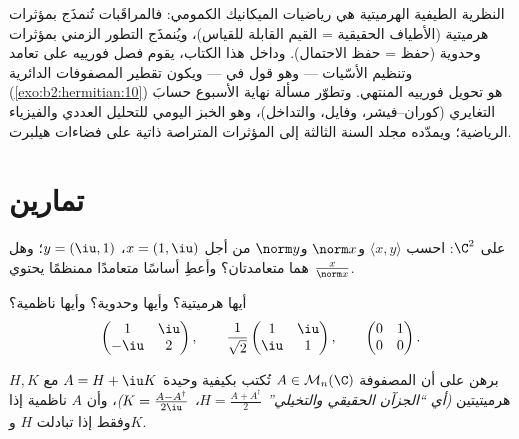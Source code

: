 \begin{remark}
النظرية الطيفية الهرميتية هي رياضيات الميكانيك
الكمومي: فالمراقَبات تُنمذَج بمؤثرات هرميتية
(الأطياف الحقيقية = القيم القابلة للقياس)، ويُنمذَج التطور الزمني بمؤثرات
وحدوية (حفظ  = حفظ الاحتمال). وداخل
هذا الكتاب، يقوم فصل فورييه على تعامد وتنظيم
الأسّيات --- وهو قول في  --- ويكون
تقطير المصفوفات الدائرية
(\cref{exo:b2:hermitian:10}) هو تحويل فورييه المنتهي.
وتطوّر مسألة نهاية الأسبوع حسابَ 
التغايري (كوران--فيشر، وفايل، والتداخل)، وهو الخبز
اليومي للتحليل العددي والفيزياء الرياضية؛ ويمدّده مجلد السنة
الثالثة إلى المؤثرات المتراصة ذاتية  على
فضاءات هيلبرت.
\end{remark}

\section{تمارين}

\begin{exercise}[$\star$]\label{exo:b2:hermitian:1}
على $\C^2$: احسب $\langle x, y\rangle$ و$\norm x$ و$\norm y$ من أجل
$x = (1, \iu)$، $y = (\iu, 1)$؛ وهل هما متعامدتان؟ وأعطِ
أساسًا متعامدًا ممنظمًا يحتوي $\frac{x}{\norm x}$.
\end{exercise}

\begin{exercise}[$\star$]\label{exo:b2:hermitian:2}
أيها هرميتية؟ وأيها وحدوية؟ وأيها ناظمية؟
\[
\begin{pmatrix} 1 & \iu\\ -\iu & 2 \end{pmatrix},
\qquad
\frac{1}{\sqrt2}\begin{pmatrix} 1 & \iu\\ \iu & 1\end{pmatrix},
\qquad
\begin{pmatrix} 0 & 1\\ 0 & 0 \end{pmatrix}.
\]
\end{exercise}

\begin{exercise}[$\star$]\label{exo:b2:hermitian:3}
برهن على أن المصفوفة $A \in \mathcal{M}_n(\C)$ تُكتب بكيفية وحيدة $A =
H + \iu K$ مع $H, K$ هرميتيتين \emph{(أي ``الجزآن الحقيقي
والتخيلي'' $H = \frac{A + A^\dagger}{2}$، $K = \frac{A -
A^\dagger}{2\iu}$)}، وأن $A$ ناظمية إذا وفقط إذا تبادلت $H$ و$K$.
\end{exercise}

